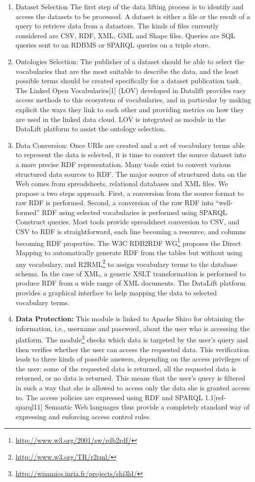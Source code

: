 \begin{enumerate}

\item{Dataset Selection}
The first step of the data lifting process is to identify and access the datasets to be processed. A dataset is either a file or the result of a query to retrieve data from a datastore. The kinds of files currently considered are CSV, RDF, XML, GML and Shape files. Queries are SQL queries sent to an RDBMS or SPARQL queries on a triple store.
\item{Ontologies Selection:}
The publisher of a dataset should be able to select the vocabularies that are the most suitable to describe the data, and the least possible terms should be created specifically for a dataset publication task. The Linked Open Vocabularies[1] (LOV) developed in Datalift provides easy access methods to this ecosystem of vocabularies, and in particular by making explicit the ways they link to each other and providing metrics on how they are used in the linked data cloud. LOV is integrated as module in the DataLift platform to assist the ontology selection.
\item{Data Conversion:}
Once URIs are created and a set of vocabulary terms able to represent the data is selected, it is time to convert the source dataset into a more precise RDF representation. Many tools exist to convert various structured data sources to RDF. The major source of structured data on the Web comes from spreadsheets, relational databases and XML files. We propose a two steps approach. First, a conversion from the source format to raw RDF is performed. Second, a conversion of the raw RDF into ``well-formed'' RDF using selected vocabularies is performed using SPARQL Construct queries. Most tools provide spreadsheet conversion to CSV, and CSV to RDF is straightforward, each line becoming a resource, and columns becoming RDF properties. The W3C RDB2RDF WG\footnote{\url{http://www.w3.org/2001/sw/rdb2rdf/}} proposes the Direct Mapping to automatically generate RDF from the tables but without using any vocabulary, and R2RML\footnote{\url{http://www.w3.org/TR/r2rml/}}  to assign vocabulary terms to the database schema. In the case of XML, a generic XSLT transformation is performed to produce RDF from a wide range of XML documents. The DataLift platform provides a graphical interface to help mapping the data to selected vocabulary terms.
\item{\textbf{Data Protection:}}
This module is linked to Apache Shiro for obtaining the information, i.e., username and password, about the user who is accessing the platform. The module\footnote{\url{http://wimmics.inria.fr/projects/shi3ld/}} checks which data is targeted by the user's query and then verifies whether the user can access the requested data. This verification leads to three kinds of possible answers, depending on the access privileges of the user: some of the requested data is returned, all the requested data is returned, or no data is returned. This means that the user's query is filtered in such a way that she is allowed to access only the data she is granted access to. The access policies are expressed using RDF and SPARQL 1.1[ref-sparql11] Semantic Web languages thus provide a completely standard way of expressing and enforcing access control rules.

\end{enumerate}
